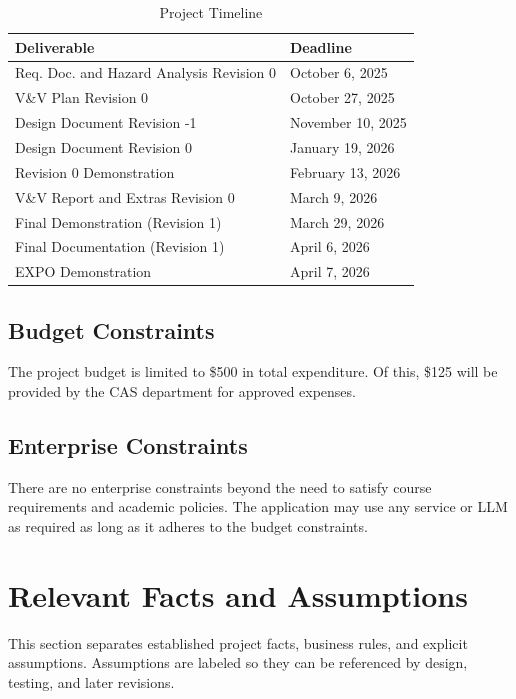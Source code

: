 \documentclass[12pt]{article}
\begin{document}
\begin{table}[H]
\centering
\caption{Project Timeline}
\label{tab:proj-schedule}
\begin{tabularx}{\textwidth}{p{6.6cm}X}
\toprule
\textbf{Deliverable} & \textbf{Deadline} \\
\midrule
Req. Doc. and Hazard Analysis Revision 0 & October 6, 2025 \\
V\&V Plan Revision 0 & October 27, 2025 \\
Design Document Revision -1 & November 10, 2025 \\
Design Document Revision 0 & January 19, 2026 \\
Revision 0 Demonstration & February 13, 2026 \\
V\&V Report and Extras Revision 0 & March 9, 2026 \\
Final Demonstration (Revision 1) & March 29, 2026 \\
Final Documentation (Revision 1) & April 6, 2026 \\
EXPO Demonstration & April 7, 2026 \\
\bottomrule
\end{tabularx}
\end{table}

\subsection{Budget Constraints}
The project budget is limited to \$500 in total expenditure. Of this,
\$125 will be provided by the CAS department for approved expenses.

\subsection{Enterprise Constraints}
There are no enterprise constraints beyond the need to satisfy course
requirements and academic policies. The application may use any
service or LLM as required as long as it adheres to the budget
constraints.

\section{Relevant Facts and Assumptions}
This section separates established project facts, business rules, and
explicit assumptions. Assumptions are labeled so they can be
referenced by design, testing, and later revisions.
\end{document}

